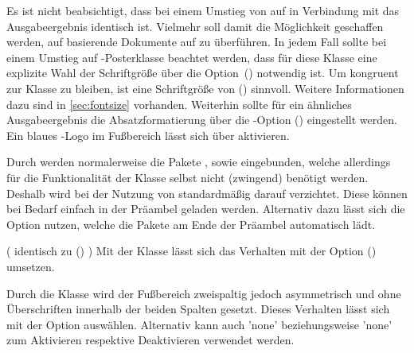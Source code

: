 \begin{Bundle*}{}
Es ist nicht beabsichtigt, dass bei einem Umstieg von  auf 
 in Verbindung mit  das Ausgabeergebnis 
identisch ist. Vielmehr soll damit die Möglichkeit geschaffen werden, auf 
 basierende Dokumente auf  zu 
überführen. In jedem Fall sollte bei einem Umstieg auf \TUDScript-Posterklasse 
beachtet werden, dass für diese Klasse eine explizite Wahl der Schriftgröße 
über die Option~() notwendig ist. Um 
kongruent zur Klasse  zu bleiben, ist eine Schriftgröße 
von () sinnvoll. 
Weitere Informationen dazu sind in \autoref{sec:fontsize} vorhanden. Weiterhin 
sollte für ein ähnliches Ausgabeergebnis die Absatzformatierung über die 
\KOMAScript-Option () eingestellt 
werden. Ein blaues \DDC-Logo im Fußbereich lässt sich über 
 aktivieren.

\begin{Declaration}{}
\printdeclarationlist%
%
Durch  werden normalerweise die Pakete , 
 sowie  eingebunden, welche allerdings für 
die Funktionalität der Klasse selbst nicht (zwingend) benötigt werden. Deshalb 
wird bei der Nutzung von  standardmäßig darauf verzichtet. 
Diese können bei Bedarf einfach in der Präambel geladen werden. Alternativ 
dazu 
lässt sich die Option  nutzen, welche die Pakete am Ende 
der Präambel automatisch lädt.
\end{Declaration}

\begin{Declaration}{}(%
  identisch zu ()%
)
\printdeclarationlist%
%
Mit der Klasse  lässt sich das Verhalten mit der Option 
() umsetzen.
\end{Declaration}

\begin{Declaration}{}%
\printdeclarationlist%
%
Durch die Klasse  wird der Fußbereich zweispaltig jedoch 
asymmetrisch und ohne Überschriften innerhalb der beiden Spalten gesetzt. 
Dieses Verhalten lässt sich mit der Option  auswählen. 
Alternativ kann auch 'none' beziehungsweise 
'none' zum Aktivieren respektive Deaktivieren 
verwendet werden.
\end{Declaration}


\end{Bundle*}
